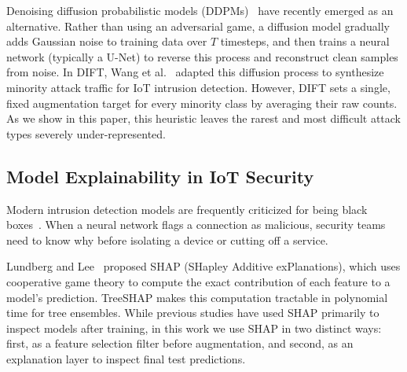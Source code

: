 Denoising diffusion probabilistic models (DDPMs)~\cite{ho2020denoising} have recently emerged as an alternative. Rather than using an adversarial game, a diffusion model gradually adds Gaussian noise to training data over $T$ timesteps, and then trains a neural network (typically a U-Net) to reverse this process and reconstruct clean samples from noise. In DIFT, Wang et al.~\cite{wang2025dift} adapted this diffusion process to synthesize minority attack traffic for IoT intrusion detection. However, DIFT sets a single, fixed augmentation target for every minority class by averaging their raw counts. As we show in this paper, this heuristic leaves the rarest and most difficult attack types severely under-represented.

\subsection{Model Explainability in IoT Security}
Modern intrusion detection models are frequently criticized for being black boxes~\cite{fauvel2021xcm}. When a neural network flags a connection as malicious, security teams need to know why before isolating a device or cutting off a service. 

Lundberg and Lee~\cite{lundberg2017unified} proposed SHAP (SHapley Additive exPlanations), which uses cooperative game theory to compute the exact contribution of each feature to a model's prediction. TreeSHAP makes this computation tractable in polynomial time for tree ensembles. While previous studies have used SHAP primarily to inspect models after training, in this work we use SHAP in two distinct ways: first, as a feature selection filter before augmentation, and second, as an explanation layer to inspect final test predictions.
